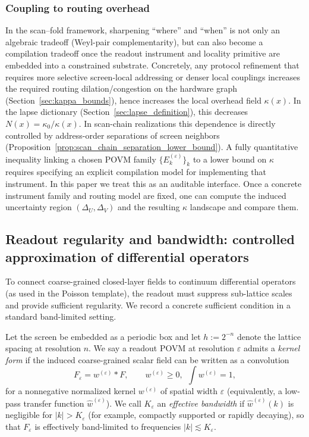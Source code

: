 \subsubsection*{Coupling to routing overhead}
In the scan--fold framework, sharpening ``where'' and ``when'' is not only an algebraic tradeoff (Weyl-pair complementarity), but can also become a compilation tradeoff once the readout instrument and locality primitive are embedded into a constrained substrate.
Concretely, any protocol refinement that requires more selective screen-local addressing or denser local couplings increases the required routing dilation/congestion on the hardware graph (Section~\ref{sec:kappa_bounds}), hence increases the local overhead field $\kappa(x)$.
In the lapse dictionary (Section~\ref{sec:lapse_definition}), this decreases $N(x)=\kappa_0/\kappa(x)$.
In scan-chain realizations this dependence is directly controlled by address-order separations of screen neighbors (Proposition~\ref{prop:scan_chain_separation_lower_bound}).
A fully quantitative inequality linking a chosen POVM family $\{E_k^{(\varepsilon)}\}_k$ to a lower bound on $\kappa$ requires specifying an explicit compilation model for implementing that instrument.
In this paper we treat this as an auditable interface.
Once a concrete instrument family and routing model are fixed, one can compute the induced uncertainty region $(\Delta_U,\Delta_V)$ and the resulting $\kappa$ landscape and compare them.

\subsection{Readout regularity and bandwidth: controlled approximation of differential operators}
\label{sec:povm_regular_differential}

To connect coarse-grained closed-layer fields to continuum differential operators (as used in the Poisson template), the readout must suppress sub-lattice scales and provide sufficient regularity.
We record a concrete sufficient condition in a standard band-limited setting.

\begin{definition}
\label{def:kernel_readout_bandwidth}
Let the screen be embedded as a periodic box and let $h:=2^{-n}$ denote the lattice spacing at resolution $n$.
We say a readout POVM at resolution $\varepsilon$ admits a \emph{kernel form} if the induced coarse-grained scalar field can be written as a convolution
\[
F_\varepsilon=w^{(\varepsilon)}\ast F,
\qquad
w^{(\varepsilon)}\ge 0,\ \ \int w^{(\varepsilon)}=1,
\]
for a nonnegative normalized kernel $w^{(\varepsilon)}$ of spatial width $\varepsilon$ (equivalently, a low-pass transfer function $\widehat w^{(\varepsilon)}$).
We call $K_\varepsilon$ an \emph{effective bandwidth} if $\widehat w^{(\varepsilon)}(k)$ is negligible for $|k|>K_\varepsilon$ (for example, compactly supported or rapidly decaying), so that $F_\varepsilon$ is effectively band-limited to frequencies $|k|\lesssim K_\varepsilon$.
\end{definition}

